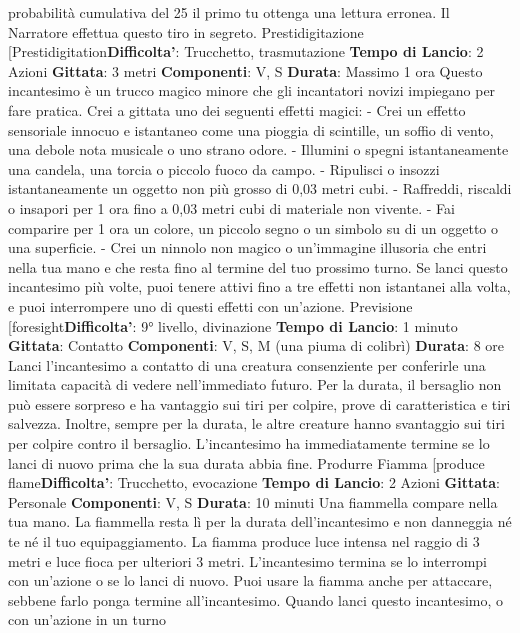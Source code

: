 \begin{multicols}{2}
probabilità cumulativa del 25%
il primo tu ottenga una lettura erronea. Il Narratore effettua
questo tiro in segreto.
Prestidigitazione
[Prestidigitation\textbf{Difficolta'}:
Trucchetto, trasmutazione
\textbf{Tempo di Lancio}: 2 Azioni
\textbf{Gittata}: 3 metri
\textbf{Componenti}: V, S
\textbf{Durata}: Massimo 1 ora
Questo incantesimo è un trucco magico minore che gli
incantatori novizi impiegano per fare pratica. Crei a
gittata uno dei seguenti effetti magici:
- Crei un effetto sensoriale innocuo e istantaneo
come una pioggia di scintille, un soffio di vento, una
debole nota musicale o uno strano odore.
- Illumini o spegni istantaneamente una candela, una
torcia o piccolo fuoco da campo.
- Ripulisci o insozzi istantaneamente un oggetto non
più grosso di 0,03 metri cubi.
- Raffreddi, riscaldi o insapori per 1 ora fino a 0,03
metri cubi di materiale non vivente.
- Fai comparire per 1 ora un colore, un piccolo segno
o un simbolo su di un oggetto o una superficie.
- Crei un ninnolo non magico o un’immagine illusoria
che entri nella tua mano e che resta fino al termine
del tuo prossimo turno.
Se lanci questo incantesimo più volte, puoi tenere attivi
fino a tre effetti non istantanei alla volta, e puoi
interrompere uno di questi effetti con un’azione.
Previsione
[foresight\textbf{Difficolta'}:
9° livello, divinazione
\textbf{Tempo di Lancio}: 1 minuto
\textbf{Gittata}: Contatto
\textbf{Componenti}: V, S, M (una piuma di colibrì)
\textbf{Durata}: 8 ore
Lanci l’incantesimo a contatto di una creatura
consenziente per conferirle una limitata capacità di
vedere nell’immediato futuro. Per la durata, il bersaglio
non può essere sorpreso e ha vantaggio sui tiri per
colpire, prove di caratteristica e tiri salvezza. Inoltre,
sempre per la durata, le altre creature hanno
svantaggio sui tiri per colpire contro il bersaglio.
L’incantesimo ha immediatamente termine se lo lanci di
nuovo prima che la sua durata abbia fine.
Produrre Fiamma
[produce flame\textbf{Difficolta'}:
Trucchetto, evocazione
\textbf{Tempo di Lancio}: 2 Azioni
\textbf{Gittata}: Personale
\textbf{Componenti}: V, S
\textbf{Durata}: 10 minuti
Una fiammella compare nella tua mano. La fiammella
resta lì per la durata dell’incantesimo e non danneggia
né te né il tuo equipaggiamento. La fiamma produce
luce intensa nel raggio di 3 metri e luce fioca per
ulteriori 3 metri. L’incantesimo termina se lo interrompi
con un’azione o se lo lanci di nuovo.
Puoi usare la fiamma anche per attaccare, sebbene
farlo ponga termine all’incantesimo. Quando lanci
questo incantesimo, o con un’azione in un turno

\end{multicols}
